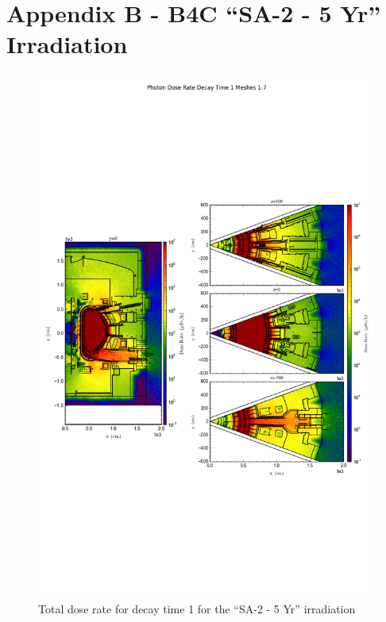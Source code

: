 \documentclass[12pt]{article}
\begin{document}
\section{Appendix B - B4C ``SA-2 - 5 Yr'' Irradiation}
\begin{figure}[ht!]
\centering
\includegraphics[trim={0cm 8cm, 0cm 8cm},clip,scale=0.75]{../plots/final_model_with_b4c/10year/Photon_Dose_Rate_Decay_Time_1_Meshes_1-7.png}
\caption{Total dose rate for decay time 1 for the ``SA-2 - 5 Yr'' irradiation}
\label{fig:photons_10y_dc1_b4c_dose}
\end{figure}
\end{document}
